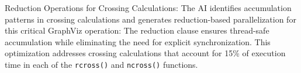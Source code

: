 Reduction Operations for Crossing Calculations: 
The AI identifies accumulation patterns in crossing calculations and generates reduction-based parallelization for this critical GraphViz operation:
The reduction clause ensures thread-safe accumulation while eliminating the need for explicit synchronization. This optimization addresses crossing calculations that account for 15\% of execution time in each of the \texttt{rcross()} and \texttt{ncross()} functions. %

